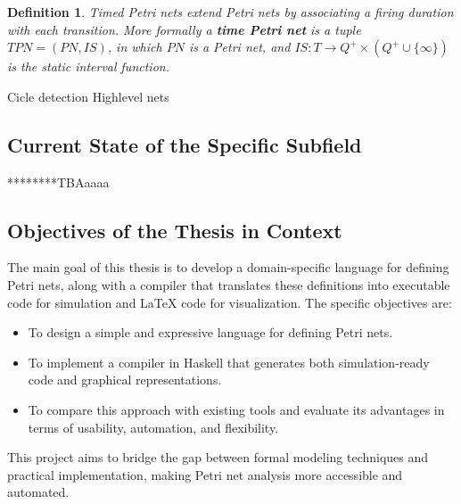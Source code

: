 \documentclass[12pt]{article}
\newtheorem{definition}{Definition}
\begin{document}
    \begin{definition}
        Timed Petri nets extend Petri nets by associating a firing duration with each transition. More formally a \textbf{time Petri net} is a tuple $TPN=(PN,IS)$, in which $PN$ is a Petri net, and $IS:T\rightarrow Q^+ \times (Q^+ \cup \{\infty\})$ is the static interval function. \cite{diaz2013petri}
    \end{definition}
        Cicle detection
        Highlevel nets
    
    \subsection{Current State of the Specific Subfield}
    ********TBAaaaa
    \subsection{Objectives of the Thesis in Context}
    The main goal of this thesis is to develop a domain-specific language for defining Petri nets, along with a compiler that translates these definitions into executable code for simulation and LaTeX code for visualization. The specific objectives are:
    \begin{itemize}
        \item To design a simple and expressive language for defining Petri nets.
        \item To implement a compiler in Haskell that generates both simulation-ready code and graphical representations.
        \item To compare this approach with existing tools and evaluate its advantages in terms of usability, automation, and flexibility.
    \end{itemize}
    This project aims to bridge the gap between formal modeling techniques and practical implementation, making Petri net analysis more accessible and automated.
    
    
\end{document}
